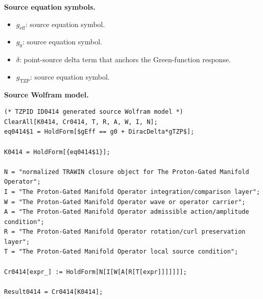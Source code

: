 \begin{minipage}[t]{0.49\linewidth}
\begingroup
\small
\raggedright
\textbf{Source equation symbols.}\par
\begin{itemize}[leftmargin=1.35em,itemsep=1pt,topsep=1pt,parsep=0pt]
    \item $g_{\mathrm{eff}}$: source equation symbol.
    \item $g_0$: source equation symbol.
    \item $\delta$: point-source delta term that anchors the Green-function response.
    \item $g_{\mathrm{TZP}}$: source equation symbol.
\end{itemize}
\endgroup
\end{minipage}\hfill
\begin{minipage}[t]{0.47\linewidth}
\begingroup
\scriptsize
\raggedright
\textbf{Source Wolfram model.}\par
\begin{Verbatim}[fontsize=\tiny,breaklines=true,breakanywhere=true]
(* TZPID ID0414 generated source Wolfram model *)
ClearAll[K0414, Cr0414, T, R, A, W, I, N];
eq0414$1 = HoldForm[$gEff == g0 + DiracDelta*gTZP$];

K0414 = HoldForm[{eq0414$1}];

N = "normalized TRAWIN closure object for The Proton-Gated Manifold Operator";
I = "The Proton-Gated Manifold Operator integration/comparison layer";
W = "The Proton-Gated Manifold Operator wave or operator carrier";
A = "The Proton-Gated Manifold Operator admissible action/amplitude condition";
R = "The Proton-Gated Manifold Operator rotation/curl preservation layer";
T = "The Proton-Gated Manifold Operator local source condition";

Cr0414[expr_] := HoldForm[N[I[W[A[R[T[expr]]]]]]];

Result0414 = Cr0414[K0414];
\end{Verbatim}
\endgroup
\end{minipage}


